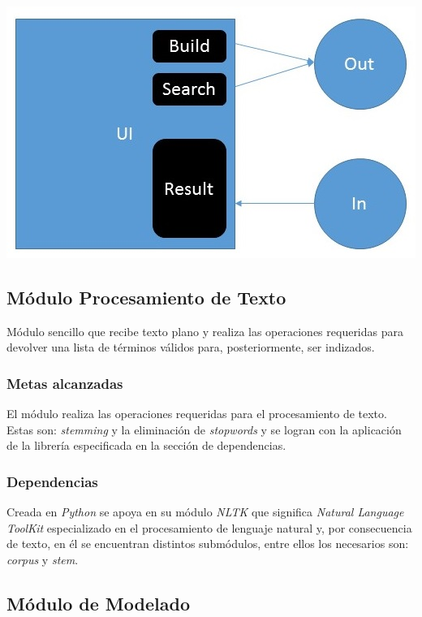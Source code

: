 \documentclass{llncs}
\begin{document}
{\includegraphics[]{ui}}
{\hfil{}}

\subsection{M\'odulo Procesamiento de Texto}

M\'odulo sencillo que recibe texto plano y realiza las operaciones requeridas para devolver una lista de t\'erminos v\'alidos para,
posteriormente, ser indizados.

\subsubsection{Metas alcanzadas}
El m\'odulo realiza las operaciones requeridas para el procesamiento de texto. Estas son: {\textit{stemming}} y la eliminaci\'on 
de {\textit{stopwords}} y se logran con la aplicaci\'on de la librer\'ia especificada en la secci\'on de dependencias.

\subsubsection{Dependencias}
Creada en {\textit{Python}} se apoya en su m\'odulo {\textit{NLTK}} que significa {\textit{Natural Language ToolKit}} especializado
en el procesamiento de lenguaje natural y, por consecuencia de texto, en \'el se encuentran distintos subm\'odulos, entre ellos los
necesarios son: {\textit{corpus}} y {\textit{stem}}.

\subsection{M\'odulo de Modelado}
\end{document}
